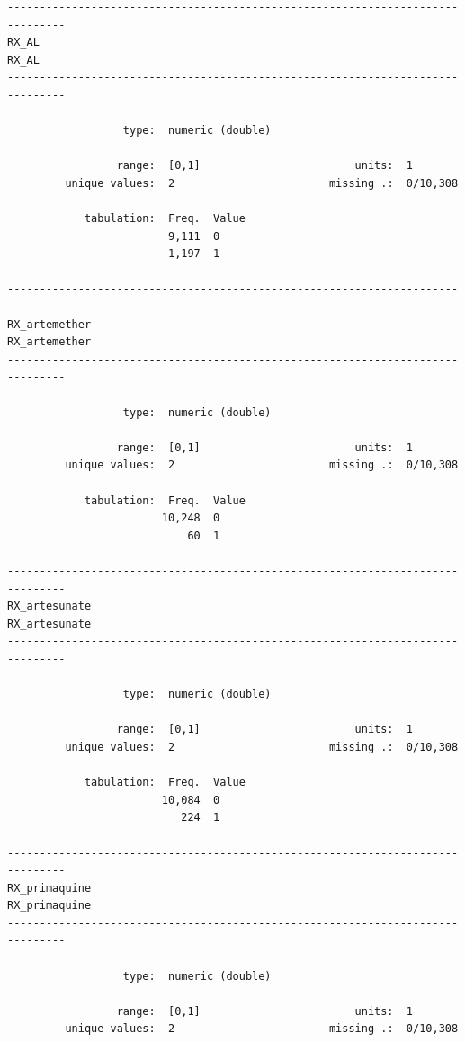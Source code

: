 \documentclass[
  letterpaper,
  DIV=11,
  numbers=noendperiod]{scrreprt}
\begin{document}
\begin{verbatim}
-------------------------------------------------------------------------------
RX_AL                                                                     RX_AL
-------------------------------------------------------------------------------

                  type:  numeric (double)

                 range:  [0,1]                        units:  1
         unique values:  2                        missing .:  0/10,308

            tabulation:  Freq.  Value
                         9,111  0
                         1,197  1

-------------------------------------------------------------------------------
RX_artemether                                                     RX_artemether
-------------------------------------------------------------------------------

                  type:  numeric (double)

                 range:  [0,1]                        units:  1
         unique values:  2                        missing .:  0/10,308

            tabulation:  Freq.  Value
                        10,248  0
                            60  1

-------------------------------------------------------------------------------
RX_artesunate                                                     RX_artesunate
-------------------------------------------------------------------------------

                  type:  numeric (double)

                 range:  [0,1]                        units:  1
         unique values:  2                        missing .:  0/10,308

            tabulation:  Freq.  Value
                        10,084  0
                           224  1

-------------------------------------------------------------------------------
RX_primaquine                                                     RX_primaquine
-------------------------------------------------------------------------------

                  type:  numeric (double)

                 range:  [0,1]                        units:  1
         unique values:  2                        missing .:  0/10,308


\end{verbatim}
\end{document}
